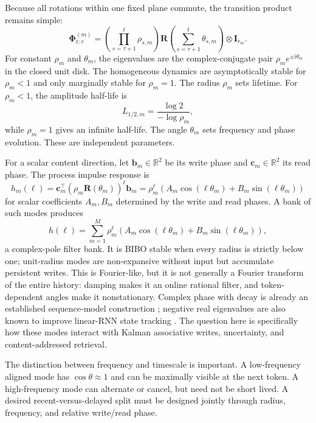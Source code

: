 \documentclass[11pt]{article}
\newcommand{\R}{\mathbb{R}}
\newcommand{\ve}[1]{\boldsymbol{#1}}
\newcommand{\tr}{\intercal}
\newcommand{\I}{\ve{I}}
\begin{document}
Because all rotations within one fixed plane commute, the transition product remains simple:
\begin{equation}
  \ve{\Phi}_{t:\tau}^{(m)}
  =
  \left(\prod_{s=\tau+1}^{t}\rho_{s,m}\right)
  \ve{R}\!\left(\sum_{s=\tau+1}^{t}\theta_{s,m}\right)
  \otimes\I_{r_m}.
  \label{eq:oscillator-product}
\end{equation}
For constant $\rho_m$ and $\theta_m$, the eigenvalues are the complex-conjugate pair
$\rho_m e^{\pm\mathrm{i}\theta_m}$ in the closed unit disk. The homogeneous dynamics are
asymptotically stable for $\rho_m<1$ and only marginally stable for $\rho_m=1$. The radius
$\rho_m$ sets lifetime. For $\rho_m<1$,
the amplitude half-life is
\begin{equation}
  L_{1/2,m}=\frac{\log 2}{-\log\rho_m},
\end{equation}
while $\rho_m=1$ gives an infinite half-life. The angle $\theta_m$ sets frequency and phase
evolution. These are independent parameters.

For a scalar content direction, let $\ve{b}_m\in\R^2$ be its write phase and
$\ve{c}_m\in\R^2$ its read phase. The process impulse response is
\begin{equation}
  h_m(\ell)
  =\ve{c}_m^{\tr}(\rho_m\ve{R}(\theta_m))^\ell\ve{b}_m
  =\rho_m^\ell
   \left(A_m\cos(\ell\theta_m)+B_m\sin(\ell\theta_m)\right)
  \label{eq:damped-mode-response}
\end{equation}
for scalar coefficients $A_m,B_m$ determined by the write and read phases. A bank of such modes
produces
\begin{equation}
  h(\ell)
  =\sum_{m=1}^{M}\rho_m^\ell
   \left(A_m\cos(\ell\theta_m)+B_m\sin(\ell\theta_m)\right),
  \label{eq:filter-bank-response}
\end{equation}
a complex-pole filter bank. It is BIBO stable when every radius is strictly below one;
unit-radius modes are non-expansive without input but accumulate persistent writes. This is
Fourier-like, but it is not generally a Fourier transform of the entire history: damping
makes it an online rational filter, and token-dependent angles make it nonstationary. Complex
phase with decay is already an established sequence-model construction
\citep{sun2023retentive}; negative real eigenvalues are also known to improve linear-RNN state
tracking \citep{grazzi2025statetracking}. The question here is specifically how these modes
interact with Kalman associative writes, uncertainty, and content-addressed retrieval.

The distinction between frequency and timescale is important. A low-frequency aligned mode
has $\cos\theta\approx1$ and can be maximally visible at the next token. A high-frequency mode
can alternate or cancel, but need not be short lived. A desired recent-versus-delayed split
must be designed jointly through radius, frequency, and relative write/read phase.
\end{document}

